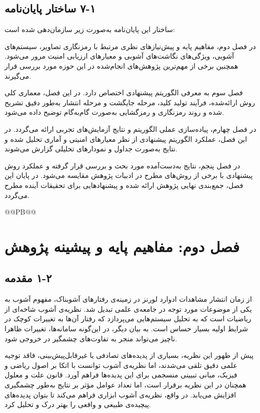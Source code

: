 \section{‏۱‏-‏۷‏ ساختار پایان‌نامه}

ساختار این پایان‌نامه به‌صورت زیر سازمان‌دهی شده است:

در فصل دوم، مفاهیم پایه و پیش‌نیازهای نظری مرتبط با رمزنگاری تصاویر، سیستم‌های آشوبی، ویژگی‌های نگاشت‌های آشوبی و معیارهای ارزیابی امنیت مرور می‌شود. همچنین برخی از مهم‌ترین پژوهش‌های انجام‌شده در این حوزه مورد بررسی قرار می‌گیرند.

فصل سوم به معرفی الگوریتم پیشنهادی اختصاص دارد. در این فصل، معماری کلی روش ارائه‌شده، فرآیند تولید کلید، مرحله جایگشت و مرحله انتشار به‌طور دقیق تشریح شده و روند رمزنگاری و رمزگشایی به‌صورت گام‌به‌گام توضیح داده می‌شود.

در فصل چهارم، پیاده‌سازی عملی الگوریتم و نتایج آزمایش‌های تجربی ارائه می‌گردد. در این فصل، عملکرد الگوریتم پیشنهادی از نظر معیارهای امنیتی و آماری تحلیل شده و نتایج به‌صورت جداول و نمودارهای تحلیلی گزارش می‌شوند.

در فصل پنجم، نتایج به‌دست‌آمده مورد بحث و بررسی قرار گرفته و عملکرد روش پیشنهادی با برخی از روش‌های مطرح در ادبیات پژوهش مقایسه می‌شود. در پایان این فصل، جمع‌بندی نهایی پژوهش ارائه شده و پیشنهادهایی برای تحقیقات آینده مطرح می‌گردد.


@@PB@@



\chapter{فصل دوم: مفاهیم پایه و پیشینه پژوهش}
\section{‏۲‏-‏۱‏ مقدمه}

از زمان انتشار مشاهدات ادوارد لورنز در زمینه‌ی رفتارهای آشوبناک، مفهوم آشوب به یکی از موضوعات مورد توجه در جامعه‌ی علمی تبدیل شد. نظریه‌ی آشوب شاخه‌ای از ریاضیات است که به تحلیل سیستم‌هایی می‌پردازد که رفتار آن‌ها به تغییرات کوچک در شرایط اولیه بسیار حساس است. به بیان دیگر، در این‌گونه سامانه‌ها، تغییرات ظاهرا ناچیز می‌تواند منجر به تفاوت‌های چشمگیر در خروجی شود.

پیش از ظهور این نظریه، بسیاری از پدیده‌های تصادفی یا غیرقابل‌پیش‌بینی، فاقد توجیه علمی دقیق تلقی می‌شدند، اما نظریه‌ی آشوب توانست با اتکا بر اصول ریاضی و فیزیک، مبانی تبیینی منسجمی برای این پدیده‌ها فراهم آورد. قانون علت و معلول همچنان در این نظریه برقرار است، اما تعداد عوامل مؤثر بر نتایج به‌طور چشمگیری افزایش می‌یابد. در واقع، نظریه‌ی آشوب ابزاری فراهم می‌کند تا بتوان پدیده‌های پیچیده‌ی طبیعی و واقعی را بهتر درک و تحلیل کرد.

